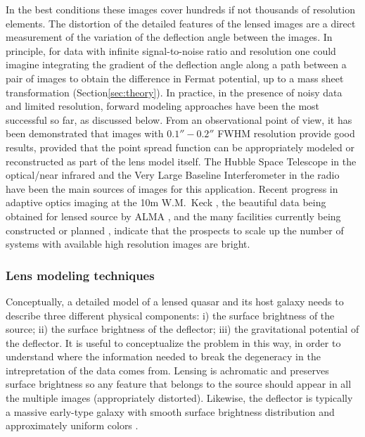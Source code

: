 In the best conditions these images cover hundreds if not thousands of
resolution elements. The distortion of the detailed features of the
lensed images are a direct measurement of the variation of the
deflection angle between the images.  In principle, for data with
infinite signal-to-noise ratio and resolution one could imagine
integrating the gradient of the deflection angle along a path between a
pair of images to obtain the difference in Fermat potential,
up to a mass sheet transformation (Section\ref{sec:theory}).
In practice, in the presence of noisy data and limited resolution,
forward modeling approaches have been the most successful so far, as
discussed below. From an observational point of view, it has been
demonstrated that images with $0.1''-0.2''$ FWHM resolution provide
good results, provided that the point spread function can be
appropriately modeled or reconstructed as part of the lens model
itself. The Hubble Space Telescope in the optical/near infrared
\citep{Suy++10,Suy++13,Suy++14,BirrerEtal2015} and the Very Large Baseline
Interferometer in the radio \citep{WBB04} have been the main sources
of images for this application. Recent progress in adaptive optics
imaging at the 10m W.M.~Keck \citep{Che++16}, the beautiful data being
obtained for lensed source by ALMA \citep{Hez++13a}, and the many
facilities currently being constructed or planned \citep{Men++15},
indicate that the prospects to scale up the number of systems with
available high resolution images are bright.


\subsubsection{Lens modeling techniques}

Conceptually, a detailed model of a lensed quasar and its host galaxy
needs to describe three different physical components: i) the surface
brightness of the source; ii) the surface brightness of the deflector;
iii) the gravitational potential of the deflector. It is useful to
conceptualize the problem in this way, in order to understand where
the information needed to break the degeneracy in the intrepretation
of the data comes from. Lensing is achromatic and preserves surface
brightness so any feature that belongs to the source \cite[including
in line of sight velocity][]{Hez++13} should appear in all the
multiple images (appropriately distorted). Likewise, the deflector is
typically a massive early-type galaxy with smooth surface brightness
distribution and approximately uniform colors \cite[except for dust,
see, e.g.][]{Suy++10}.

